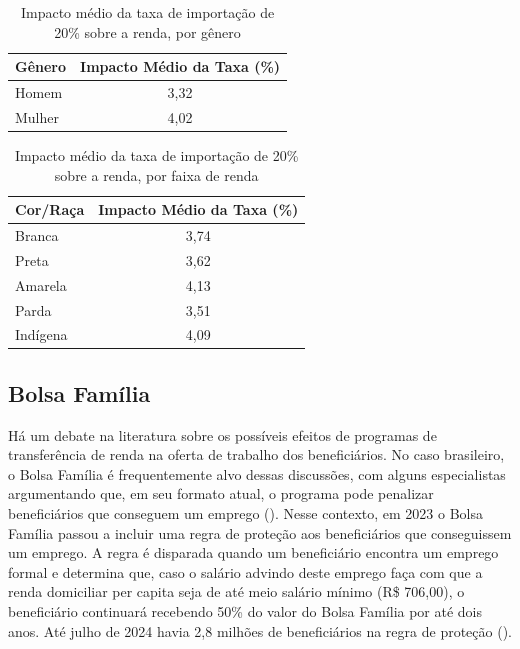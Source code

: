 \documentclass[12pt]{article}
\theoremstyle{break}
\begin{document}
\begin{table}[H]
\centering
\begin{tabular}{l|c}
\textbf{Gênero} & \textbf{Impacto Médio da Taxa (\%)} \\ \hline
Homem                     & 3,32                               \\ \hline
Mulher                   & 4,02
\end{tabular}
\caption{Impacto médio da taxa de importação de 20\% sobre a renda, por gênero}
\label{tab: impacto_taxa_genero}
\end{table}

\begin{table}[H]
\centering
\begin{tabular}{l|c}
\textbf{Cor/Raça} & \textbf{Impacto Médio da Taxa (\%)} \\ \hline
Branca                     & 3,74                              \\ \hline
Preta                   & 3,62                           \\ \hline
Amarela                  & 4,13                              \\ \hline
Parda                & 3,51                              \\ \hline
Indígena                & 4,09
\end{tabular}
\caption{Impacto médio da taxa de importação de 20\% sobre a renda, por faixa de renda}
\label{tab: impacto_taxa_cor}
\end{table}

\subsection{Bolsa Família}

Há um debate na literatura sobre os possíveis efeitos de programas de transferência de renda na oferta de trabalho dos beneficiários. No caso brasileiro, o Bolsa Família é frequentemente alvo dessas discussões, com alguns especialistas argumentando que, em seu formato atual, o programa pode penalizar beneficiários que conseguem um emprego (\cite{bbc_bf}). Nesse contexto, em 2023 o Bolsa Família passou a incluir uma regra de proteção aos beneficiários que conseguissem um emprego. A regra é disparada quando um beneficiário encontra um emprego formal e determina que, caso o salário advindo deste emprego faça com que a renda domiciliar per capita seja de até meio salário mínimo (R\$ 706,00), o beneficiário continuará recebendo 50\% do valor do Bolsa Família por até dois anos. Até julho de 2024 havia 2,8 milhões de beneficiários na regra de proteção (\cite{poder360_bf}). 
\end{document}
